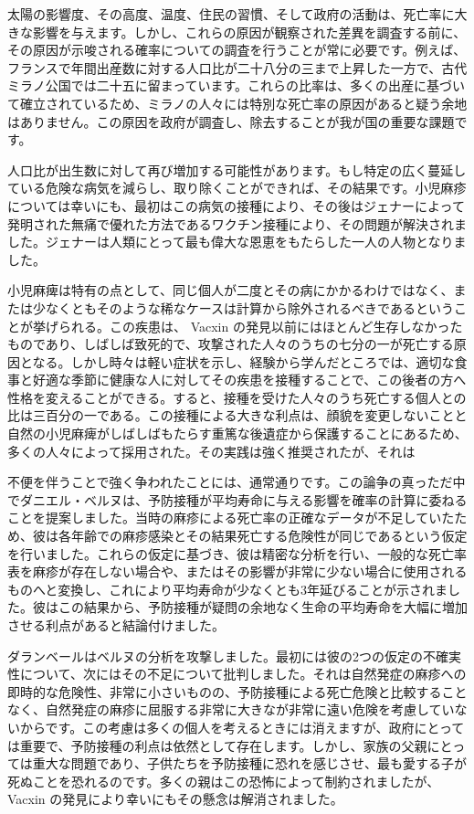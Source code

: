 \documentclass[a4paper,11pt,openany]{ltjsbook}
\begin{document}
太陽の影響度、その高度、温度、住民の習慣、そして政府の活動は、死亡率に大きな影響を与えます。しかし、これらの原因が観察された差異を調査する前に、その原因が示唆される確率についての調査を行うことが常に必要です。例えば、フランスで年間出産数に対する人口比が二十八分の三まで上昇した一方で、古代ミラノ公国では二十五に留まっています。これらの比率は、多くの出産に基づいて確立されているため、ミラノの人々には特別な死亡率の原因があると疑う余地はありません。この原因を政府が調査し、除去することが我が国の重要な課題です。

人口比が出生数に対して再び増加する可能性があります。もし特定の広く蔓延している危険な病気を減らし、取り除くことができれば、その結果です。小児麻疹については幸いにも、最初はこの病気の接種により、その後はジェナーによって発明された無痛で優れた方法であるワクチン接種により、その問題が解決されました。ジェナーは人類にとって最も偉大な恩恵をもたらした一人の人物となりました。

小児麻痺は特有の点として、同じ個人が二度とその病にかかるわけではなく、または少なくともそのような稀なケースは計算から除外されるべきであるということが挙げられる。この疾患は、 Vacxin の発見以前にはほとんど生存しなかったものであり、しばしば致死的で、攻撃された人々のうちの七分の一が死亡する原因となる。しかし時々は軽い症状を示し、経験から学んだところでは、適切な食事と好適な季節に健康な人に対してその疾患を接種することで、この後者の方へ性格を変えることができる。すると、接種を受けた人々のうち死亡する個人との比は三百分の一である。この接種による大きな利点は、顔貌を変更しないことと自然の小児麻痺がしばしばもたらす重篤な後遺症から保護することにあるため、多くの人々によって採用された。その実践は強く推奨されたが、それは


不便を伴うことで強く争われたことには、通常通りです。この論争の真っただ中でダニエル・ベルヌは、予防接種が平均寿命に与える影響を確率の計算に委ねることを提案しました。当時の麻疹による死亡率の正確なデータが不足していたため、彼は各年齢での麻疹感染とその結果死亡する危険性が同じであるという仮定を行いました。これらの仮定に基づき、彼は精密な分析を行い、一般的な死亡率表を麻疹が存在しない場合や、またはその影響が非常に少ない場合に使用されるものへと変換し、これにより平均寿命が少なくとも3年延びることが示されました。彼はこの結果から、予防接種が疑問の余地なく生命の平均寿命を大幅に増加させる利点があると結論付けました。

ダランベールはベルヌの分析を攻撃しました。最初には彼の2つの仮定の不確実性について、次にはその不足について批判しました。それは自然発症の麻疹への即時的な危険性、非常に小さいものの、予防接種による死亡危険と比較することなく、自然発症の麻疹に屈服する非常に大きなが非常に遠い危険を考慮していないからです。この考慮は多くの個人を考えるときには消えますが、政府にとっては重要で、予防接種の利点は依然として存在します。しかし、家族の父親にとっては重大な問題であり、子供たちを予防接種に恐れを感じさせ、最も愛する子が死ぬことを恐れるのです。多くの親はこの恐怖によって制約されましたが、 Vacxin の発見により幸いにもその懸念は解消されました。
\end{document}
